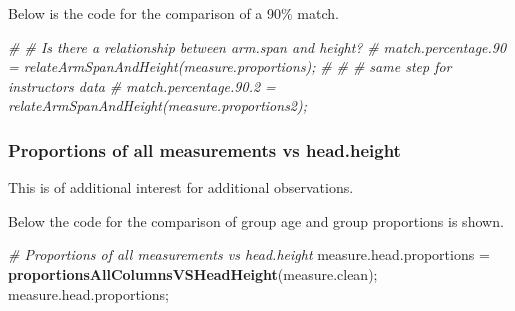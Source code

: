 \documentclass[]{article}
\newenvironment{Shaded}{\begin{snugshade}}{\end{snugshade}}
\newcommand{\CommentTok}[1]{\textcolor[rgb]{0.56,0.35,0.01}{\textit{#1}}}
\newcommand{\KeywordTok}[1]{\textcolor[rgb]{0.13,0.29,0.53}{\textbf{#1}}}
\newcommand{\NormalTok}[1]{#1}
\newcommand{\StringTok}[1]{\textcolor[rgb]{0.31,0.60,0.02}{#1}}
\begin{document}
Below is the code for the comparison of a 90\% match.

\begin{Shaded}
\begin{Highlighting}[]
\CommentTok{\# \# Is there a relationship between arm.span and height?}
\CommentTok{\# match.percentage.90 = relateArmSpanAndHeight(measure.proportions);}
\CommentTok{\# }
\CommentTok{\# \# same step for instructors data}
\CommentTok{\# match.percentage.90.2 = relateArmSpanAndHeight(measure.proportions2);}
\end{Highlighting}
\end{Shaded}

\newpage

\subsubsection{Proportions of all measurements vs head.height}
\label{sec:appendix-proportions}

This is of additional interest for additional observations.

Below the code for the comparison of group age and group proportions is
shown.

\begin{Shaded}
\begin{Highlighting}[]
\CommentTok{\# Proportions of all measurements vs head.height}
\NormalTok{measure.head.proportions =}\StringTok{ }\KeywordTok{proportionsAllColumnsVSHeadHeight}\NormalTok{(measure.clean);}
\NormalTok{measure.head.proportions;}
\end{Highlighting}
\end{Shaded}
\end{document}
